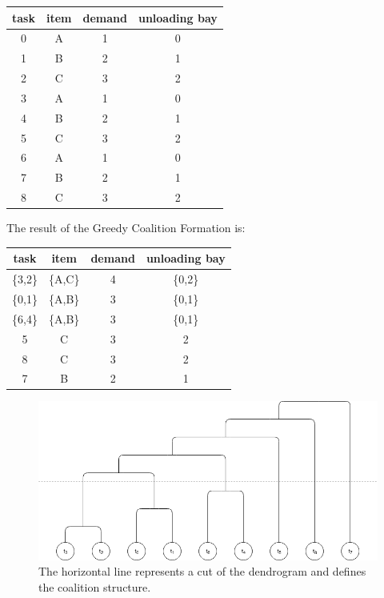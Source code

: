 \begin{center}
  \begin{tabular}{|c|c|c|c|} \hline
  \textbf{task} & \textbf{item} & \textbf{demand} & \textbf{unloading bay} \\ \hline
  0    & A    & 1      & 0             \\
  1    & B    & 2      & 1             \\
  2    & C    & 3      & 2             \\
  3    & A    & 1      & 0             \\
  4    & B    & 2      & 1             \\
  5    & C    & 3      & 2             \\
  6    & A    & 1      & 0             \\
  7    & B    & 2      & 1             \\
  8    & C    & 3      & 2             \\ \hline       
  \end{tabular}
\end{center}


The result of the Greedy Coalition Formation is:
\begin{center}
  \begin{tabular}{|c|c|c|c|} \hline
  \textbf{task} & \textbf{item} & \textbf{demand} & \textbf{unloading bay} \\ \hline
  \{3,2\}    & \{A,C\}    & 4     & \{0,2\}             \\
  \{0,1\}    & \{A,B\}    & 3     & \{0,1\}             \\
  \{6,4\}    & \{A,B\}    & 3     & \{0,1\}             \\
  5    & C    & 3      & 2             \\
  8    & C    & 3      & 2             \\        
  7    & B    & 2      & 1             \\\hline
  \end{tabular}
\end{center}

\begin{figure} [hbt]
    \centering
    \includegraphics[width=\textwidth]{img/CF.png}
    \caption{The horizontal line represents a cut of the dendrogram
    and defines the coalition structure.}
    \label{fig:CF_graph}
\end{figure}

